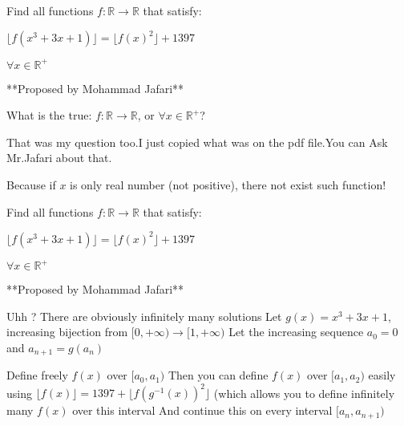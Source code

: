 \begin{solution}
	\begin{tcolorbox}Find all functions $f:\mathbb{R} \to \mathbb{R}$ that satisfy:

$\lfloor{f(x^3+3x+1)} \rfloor =\lfloor{f(x)^2} \rfloor +1397$  

$\forall x \in \mathbb{R}^{+}$

**Proposed by Mohammad Jafari**\end{tcolorbox}

What is the true: $f:\mathbb{R} \to \mathbb{R}$, or $\forall x \in \mathbb{R}^{+}$?


\end{solution}



\begin{solution}
	That was my question too.I just copied what was on the pdf file.You can Ask Mr.Jafari about that.
\end{solution}



\begin{solution}
	Because if $x$ is only real number (not positive), there not exist such function!
\end{solution}



\begin{solution}
	\begin{tcolorbox}Find all functions $f:\mathbb{R} \to \mathbb{R}$ that satisfy:

$\lfloor{f(x^3+3x+1)} \rfloor =\lfloor{f(x)^2} \rfloor +1397$  

$\forall x \in \mathbb{R}^{+}$

**Proposed by Mohammad Jafari**\end{tcolorbox}
Uhh ?
There are obviously infinitely many solutions
Let $g(x)=x^3+3x+1$, increasing bijection from $[0,+\infty)\to[1,+\infty)$
Let the increasing sequence $a_0=0$ and $a_{n+1}=g(a_n)$

Define freely $f(x)$ over $[a_0,a_1)$
Then you can define $f(x)$ over $[a_1,a_2)$ easily using $\lfloor f(x)\rfloor=1397+\lfloor f(g^{-1}(x))^2\rfloor$
(which allows you to define infinitely many $f(x)$ over this interval
And continue this on every interval $[a_n,a_{n+1})$

\end{solution}



